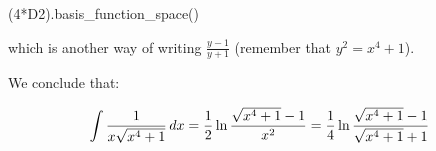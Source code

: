 \begin{sageblock}[geddes]
(4*D2).basis_function_space()
\end{sageblock}

which is another way of writing $\frac{y-1}{y+1}$ (remember
that $y^2 = x^4+1$).

We conclude that:

$$\int {1\over{x\sqrt{x^4+1}}} \, dx
={1\over2} \ln {{\sqrt{x^4+1}-1}\over{x^2}}
={1\over4} \ln {{\sqrt{x^4+1}-1}\over{\sqrt{x^4+1}+1}}$$

\endexample

\begin{comment}
\vfill\eject
\mysection{Chebyshev's Integral}

\example Compute:
\label{Chebyshev's Integral}
$$\int {{2x^6+4x^5+7x^4-3x^3-x^2-8x-8}\over{(2x^2-1)^2\sqrt{x^4+4 x^3+2 x^2+1}}} \,{\rm d}x$$

The polynomial under the square root is square-free:

\begin{maximablock}
num : 2*x^6 + 4*x^5 + 7*x^4-3*x^3-x^2-8*x-8$
den : (2*x^2-1)^2$
root : x^4+4*x^3+2*x^2+1$

f : y^2 - root$
integral : num/(den*y) * del(x)$
\end{maximablock}

\begin{maximablock}
solve(root);
solve(den);
\end{maximablock}

\begin{maximablock}
for r in append(solve(root), solve(den), [x=inf]) do
  disp(puiseux(f,x,y,rhs(r),false,-1,integral))$
\end{maximablock}

We have second order poles at $x=\pm\frac{1}{\sqrt{2}}$ and infinity.
There are also first order components, which indicates that we
will have both algebraic and logarithmic components.

Let's extract the disivors at which there are poles:

\begin{maximablock}
extract_divisor(x0) :=
  apply(append,
    map(lambda([exp], if is(exp[1] # 0) then [[[if rhs(exp[2]) # 1/x then x-rhs(exp[2]) else inf, rhs(exp[3])], -2]] else []),
        puiseux(f,x,y,rhs(x0),false,-1,integral)))
$
div : unique(apply(append, map(extract_divisor, append(solve(root), solve(den), [x=inf]))));
\end{maximablock}

Our basis, principal parts matrix and its pseudoinverse:

\begin{maximablock}
/* This runs forever */
basis : riemannroch(f,x,y,div);

m : principal_parts_matrix(f,x,y, basis, div);

pi : pseudoinverse(m);
\end{maximablock}

\endexample
\end{comment}

